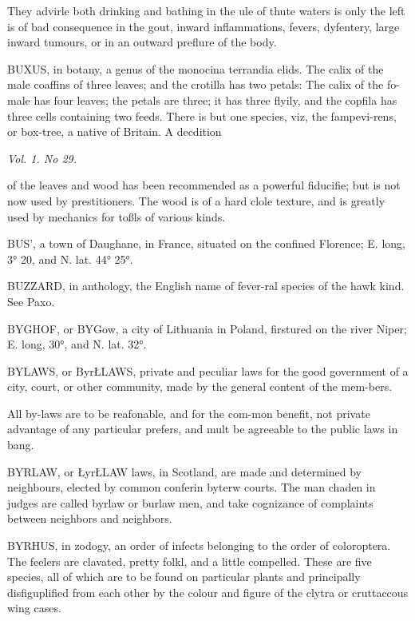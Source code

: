 They advirle both drinking and bathing in the ule of thute waters is only the left is of bad consequence in the gout, inward inflammations, fevers, dyfentery, large inward tumours, or in an outward preflure of the body.\par\medskip
BUXUS, in botany, a genus of the monocina terrandia elids. The calix of the male coaffins of three leaves; and the crotilla has two petals: The calix of the fo- male has four leaves; the petals are three; it has three flyily, and the copfila has three cells containing two feeds. There is but one species, viz, the fampevi-rens, or box-tree, a native of Britain. A decdition\par\medskip
{\small\itshape Vol. 1. No 29.\par}\medskip
of the leaves and wood has been recommended as a powerful fiducifie; but is not now used by prestitioners. The wood is of a hard clole texture, and is greatly used by mechanics for toßls of various kinds.\par\medskip
BUS', a town of Daughane, in France, situated on the confined Florence; E. long, 3° 20, and N. lat. 44° 25°.\par\medskip
BUZZARD, in anthology, the English name of fever-ral species of the hawk kind. See Paxo.\par\medskip
BYGHOF, or BYGow, a city of Lithuania in Poland, firstured on the river Niper; E. long, 30°, and N. lat. 32°.\par\medskip
BYLAWS, or ByrŁLAWS, private and peculiar laws for the good government of a city, court, or other community, made by the general content of the mem-bers.\par\medskip
All by-laws are to be reafonable, and for the com-mon benefit, not private advantage of any particular prefers, and mult be agreeable to the public laws in bang.\par\medskip
BYRLAW, or ŁyrŁLAW laws, in Scotland, are made and determined by neighbours, elected by common conferin byterw courts. The man chaden in judges are called byrlaw or burlaw men, and take cognizance of complaints between neighbors and neighbors.\par\medskip
BYRHUS, in zodogy, an order of infects belonging to the order of coloroptera. The feelers are clavated, pretty folkl, and a little compelled. These are five species, all of which are to be found on particular plants and principally disfiguplified from each other by the colour and figure of the clytra or cruttaccous wing cases.\par\medskip
